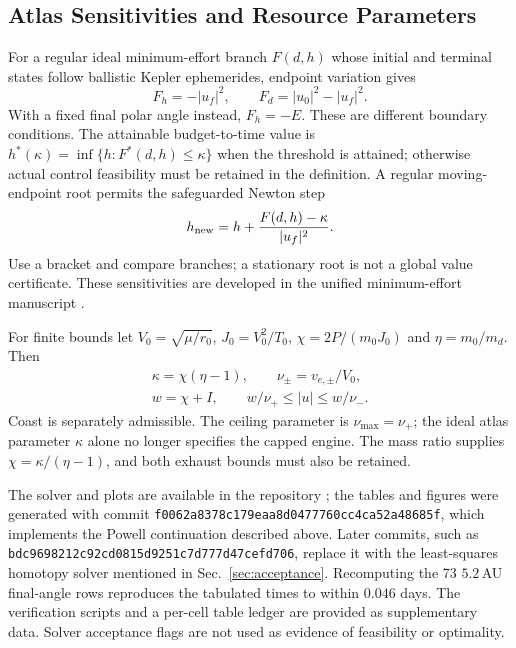 \documentclass[journal,a4paper]{IEEEtran}
\begin{document}
\subsection{Atlas Sensitivities and Resource Parameters}
For a regular ideal minimum-effort branch $F(d,h)$ whose initial and
terminal states follow ballistic Kepler ephemerides, endpoint variation gives
\begin{equation}
 F_h=-|u_f|^2,\qquad F_d=|u_0|^2-|u_f|^2.
\end{equation}
With a fixed final polar angle instead, $F_h=-E$. These are different
boundary conditions. The attainable budget-to-time value is
$h^*(\kappa)=\inf\{h:F^*(d,h)\le\kappa\}$ when the threshold is attained;
otherwise actual control feasibility must be retained in the definition.
A regular moving-endpoint root permits the safeguarded Newton step
\begin{equation}
 h_{\rm new}=h+\frac{F(d,h)-\kappa}{|u_f|^2}.
\end{equation}
Use a bracket and compare branches; a stationary root is not a global
value certificate. These sensitivities are developed in the unified
minimum-effort manuscript \cite{OlsinaMinimumEffort}.

For finite bounds let $V_0=\sqrt{\mu/r_0}$, $J_0=V_0^2/T_0$,
$\chi=2P/(m_0J_0)$ and $\eta=m_0/m_d$. Then
\begin{equation}
\begin{gathered}
 \kappa=\chi(\eta-1),\qquad \nu_\pm=v_{e,\pm}/V_0,\\
 w=\chi+I,\qquad w/\nu_+\le|u|\le w/\nu_-.
\end{gathered}
\end{equation}
Coast is separately admissible. The ceiling parameter is
$\nu_{\max}=\nu_+$; the ideal atlas parameter $\kappa$ alone no longer
specifies the capped engine. The mass ratio supplies
$\chi=\kappa/(\eta-1)$, and both exhaust bounds must also be retained.

The solver and plots are available in the repository \cite{Olsina2025};
the tables and figures were generated with commit
\nolinkurl{f0062a8378c179eaa8d0477760cc4ca52a48685f}, which implements the
Powell continuation described above. Later commits, such as
\nolinkurl{bdc9698212c92cd0815d9251c7d777d47cefd706}, replace it with the
least-squares homotopy solver mentioned in Sec.~\ref{sec:acceptance}.
Recomputing the 73 $5.2$\,AU final-angle rows reproduces the tabulated
times to within $0.046$ days.
The verification scripts and a per-cell table ledger are provided as
supplementary data. Solver acceptance flags are not used as
evidence of feasibility or optimality.
\end{document}
